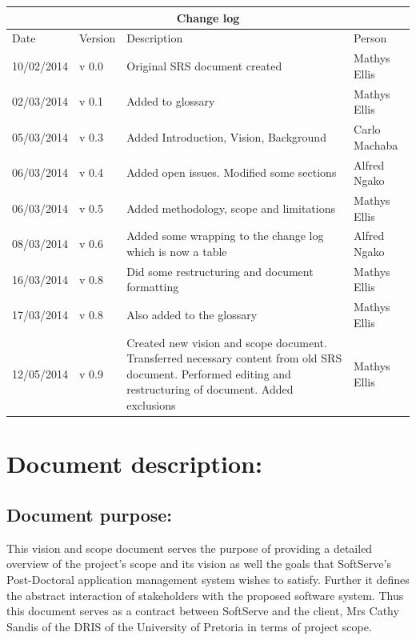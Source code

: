 \documentclass[12pt]{article}
\begin{document}
\begin{center}
\begin{tabular}{|l|p{1.4cm}|p{8cm}|p{2.8cm}|}
\hline
\multicolumn{4}{|c|}{\bf Change log} \\
\hline
 Date & Version & Description &  Person \\
\hline
10/02/2014 & v 0.0 & Original SRS document created & Mathys Ellis \\
\hline
02/03/2014 & v 0.1 & Added to glossary & Mathys Ellis \\
\hline
05/03/2014 & v 0.3 & Added Introduction, Vision, Background & Carlo Machaba \\
\hline
06/03/2014 & v 0.4 & Added open issues. Modified some sections & Alfred Ngako \\
\hline
06/03/2014 & v 0.5 & Added methodology, scope and limitations & Mathys Ellis \\
\hline
08/03/2014 & v 0.6 & Added some wrapping to the change log which is now a table & Alfred Ngako \\
\hline
16/03/2014 & v 0.8 & Did some restructuring and document formatting & Mathys Ellis \\
\hline
17/03/2014 & v 0.8 & Also added to the glossary & Mathys Ellis \\
\hline
12/05/2014 & v 0.9 & Created new vision and scope document. Transferred necessary content from old SRS document. Performed editing and restructuring of document. Added exclusions & Mathys Ellis \\
\hline

\end{tabular}
\end{center}
\newpage
\tableofcontents

\listoffigures
\newpage
\section{Document description:}

\subsection{Document purpose:}
\vspace{0.2in}
This vision and scope document serves the purpose of providing a detailed overview of the project's scope and its vision as well the goals that SoftServe's Post-Doctoral application management system wishes to satisfy. Further it defines the abstract interaction of stakeholders with the proposed software system. Thus this document serves as a contract between SoftServe and the client, Mrs Cathy Sandis of the DRIS of the University of Pretoria in terms of project scope.
\end{document}
